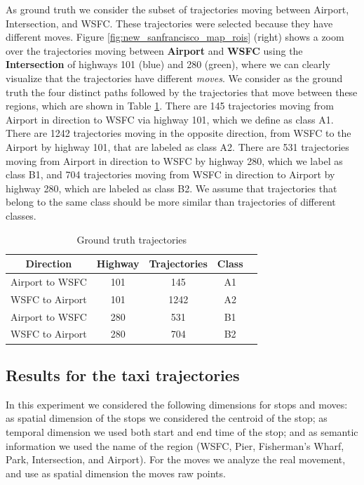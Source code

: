 As ground truth we consider the subset of trajectories moving between Airport,  Intersection, and WSFC. These trajectories were selected because they have different moves.  Figure {\ref{fig:new_sanfrancisco_map_rois}} (right) shows a zoom over the trajectories moving between  \textbf{Airport} and \textbf{WSFC}  using the \textbf{Intersection} of highways 101 (blue) and 280 (green), where we can clearly visualize that the trajectories have different \emph{moves}. We consider as the ground truth the four distinct paths followed by the trajectories that move between these regions, which are shown in Table {\ref{tab:new_san_francisco_dataset}}. There are 145 trajectories moving from Airport in direction to WSFC via highway 101, which we define as class A1. There are 1242 trajectories moving in the opposite direction, from WSFC to the Airport by highway 101, that are labeled as class A2. There are 531 trajectories moving from Airport in direction to WSFC by highway 280, which we label as class B1, and 704 trajectories moving from WSFC in direction to Airport by highway 280, which are labeled as class B2. We assume that trajectories that belong to the same class should be more similar than trajectories of different classes.

\begin{table}[h]
\scriptsize
  \centering
  \begin{tabular}{|c|c|c|c|c|}
  \hline
 Direction & Highway & Trajectories & Class \\
  \hline
 Airport to WSFC & 101 & 145 & A1\\
 WSFC to Airport & 101 & 1242 & A2\\
 Airport to WSFC & 280 & 531 & B1\\
 WSFC to Airport & 280 & 704 & B2\\
    \hline
  \end{tabular}
  \caption{Ground truth trajectories}
  \label{tab:new_san_francisco_dataset}
\end{table}

\subsection{Results for the taxi trajectories}

{In this experiment we considered the following dimensions for stops and moves: as spatial dimension of the stops we considered the centroid of the stop; as temporal dimension we used both start and end time of the stop; and as semantic information we used the name of the region (WSFC, Pier, Fisherman's Wharf, Park, Intersection, and Airport). For the moves we analyze the real movement, and use as spatial dimension the moves raw points.}

